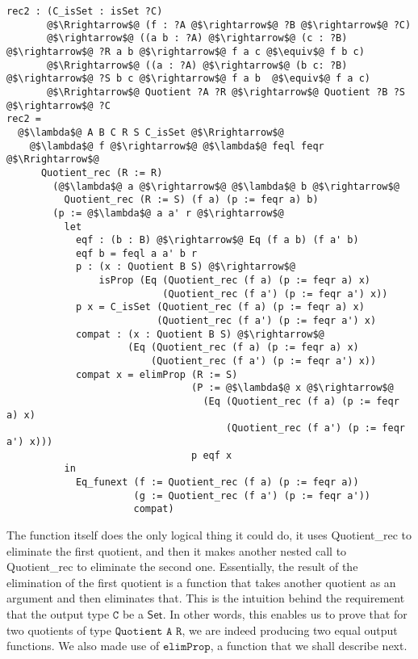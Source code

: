 \documentclass[12pt,twoside,maitrise]{dms}
\theoremstyle{definition}
\numberwithin{equation}{section}
\numberwithin{table}{chapter}
\numberwithin{figure}{chapter}
\newcommand\kw[1] {\textsf{#1}}
\newcommand\id[1] {\texttt{#1}}
\begin{document}
\begin{verbatim}
rec2 : (C_isSet : isSet ?C)
       @$\Rrightarrow$@ (f : ?A @$\rightarrow$@ ?B @$\rightarrow$@ ?C)
       @$\rightarrow$@ ((a b : ?A) @$\rightarrow$@ (c : ?B) @$\rightarrow$@ ?R a b @$\rightarrow$@ f a c @$\equiv$@ f b c)
       @$\Rrightarrow$@ ((a : ?A) @$\rightarrow$@ (b c: ?B) @$\rightarrow$@ ?S b c @$\rightarrow$@ f a b  @$\equiv$@ f a c)
       @$\Rrightarrow$@ Quotient ?A ?R @$\rightarrow$@ Quotient ?B ?S @$\rightarrow$@ ?C
rec2 =
  @$\lambda$@ A B C R S C_isSet @$\Rrightarrow$@
    @$\lambda$@ f @$\rightarrow$@ @$\lambda$@ feql feqr @$\Rrightarrow$@
      Quotient_rec (R := R)
        (@$\lambda$@ a @$\rightarrow$@ @$\lambda$@ b @$\rightarrow$@
          Quotient_rec (R := S) (f a) (p := feqr a) b)
        (p := @$\lambda$@ a a' r @$\rightarrow$@
          let
            eqf : (b : B) @$\rightarrow$@ Eq (f a b) (f a' b)
            eqf b = feql a a' b r
            p : (x : Quotient B S) @$\rightarrow$@
                isProp (Eq (Quotient_rec (f a) (p := feqr a) x)
                           (Quotient_rec (f a') (p := feqr a') x))
            p x = C_isSet (Quotient_rec (f a) (p := feqr a) x)
                          (Quotient_rec (f a') (p := feqr a') x)
            compat : (x : Quotient B S) @$\rightarrow$@
                     (Eq (Quotient_rec (f a) (p := feqr a) x)
                         (Quotient_rec (f a') (p := feqr a') x))
            compat x = elimProp (R := S)
                                (P := @$\lambda$@ x @$\rightarrow$@
                                  (Eq (Quotient_rec (f a) (p := feqr a) x)
                                      (Quotient_rec (f a') (p := feqr a') x)))
                                p eqf x
          in
            Eq_funext (f := Quotient_rec (f a) (p := feqr a))
                      (g := Quotient_rec (f a') (p := feqr a'))
                      compat)
\end{verbatim}

The function itself does the only logical thing it could do, it uses
\kw{Quotient\_rec} to eliminate the first quotient, and then it makes another
nested call to \kw{Quotient\_rec} to eliminate the second one. Essentially, the
result of the elimination of the first quotient is a function that takes another
quotient as an argument and then eliminates that. This is the intuition behind
the requirement that the output type $\id{C}$ be a $\kw{Set}$. In other words,
this enables us to prove that for two quotients of type $\id{Quotient A R}$, we
are indeed producing two equal output functions. We also made use of
$\id{elimProp}$, a function that we shall describe next.
\end{document}

